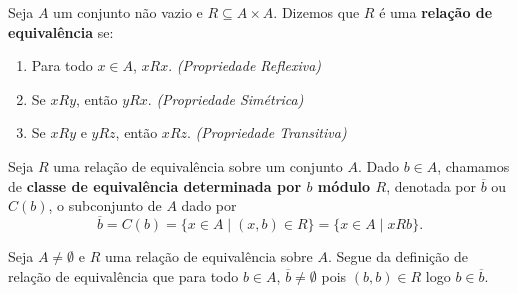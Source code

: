 \begin{definicao}
    Seja $A$ um conjunto n{\~a}o vazio e $R\subseteq A \times A$. Dizemos que $R$ {\'e} uma \textbf{rela{\c c}{\~a}o de equival{\^e}ncia} se:
    \begin{enumerate}[label={\roman*})]
        \item Para todo $x \in A$, $xRx$. \textit{(Propriedade Reflexiva)}
        \item Se $xRy$, ent\~ao $yRx$. \textit{(Propriedade Sim\'etrica)}
        \item Se $xRy$ e $yRz$, ent\~ao $xRz$. \textit{(Propriedade Transitiva)}
    \end{enumerate}
\end{definicao}

\begin{definicao}
    Seja $R$ uma rela{\c c}{\~a}o de equival{\^e}ncia sobre um conjunto $A$. Dado $b \in A$, chamamos de \textbf{classe de equival{\^e}ncia determinada por $b$ m{\'o}dulo $R$}, denotada por $\overline{b}$ ou $C(b)$, o subconjunto de $A$ dado por
    \[
        \overline{b} = C(b) = \{x \in A \mid (x,b) \in R\} = \{x \in A \mid xRb\}.
    \]
\end{definicao}

\begin{observacao}
    Seja $A \ne \emptyset$ e $R$ uma rela\c{c}\~ao de equival\^encia sobre $A$. Segue da defini\c{c}\~ao de rela\c{c}\~ao de equival\^encia que para todo $b \in A$, $\overline{b} \ne \emptyset$ pois $(b,b) \in R$ logo $b \in \overline{b}$.
\end{observacao}

